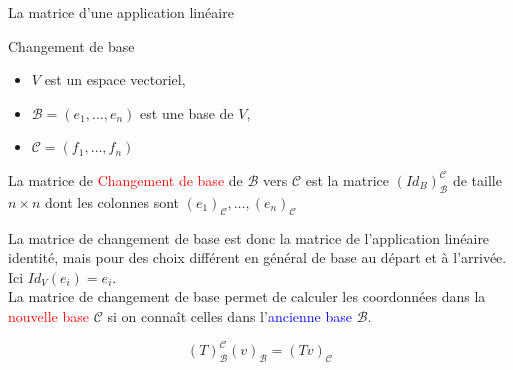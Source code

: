 \begin{parag}{La matrice d'une application linéaire}
\end{parag}

\begin{parag}{Changement de base}
\begin{itemize}
    \item $V$ est un espace vectoriel,
    \item $\mathcal{B} = \left(e_1, \dots, e_n\right)$ est une base de $V$,
    \item $\mathcal{C} = \left(f_1, \dots,f_n \right)$
\end{itemize}
        \begin{definition}
            La matrice de \textcolor{red}{Changement de base} de $\mathcal{B}$ vers $\mathcal{C}$ est la matrice $\left(Id_B\right)_{\mathcal{B}}^{\mathcal{C}}$ de taille $n \times n$ dont les colonnes sont $\left(e_1\right)_{\mathcal{C}}, \dots, \left(e_n\right)_{\mathcal{C}}$
        \end{definition}
        La matrice de changement de base est donc la matrice de l'application linéaire identité, mais pour des choix différent en général de base au départ et à l'arrivée. Ici $Id_V\left(e_i\right) = e_i$.
\\

La matrice de changement de base permet de calculer les coordonnées dans la \textcolor{red}{nouvelle base} $\mathcal{C}$ si on connaît celles dans l'\textcolor{blue}{ancienne base } $\mathcal{B}$.
        \begin{theoreme}
        \[\left(T\right)_{\mathcal{B}}^{\mathcal{C}}\left(v\right)_{\mathcal{B}} = \left(Tv\right)_{\mathcal{C}}\]
        \end{theoreme}


\end{parag}
